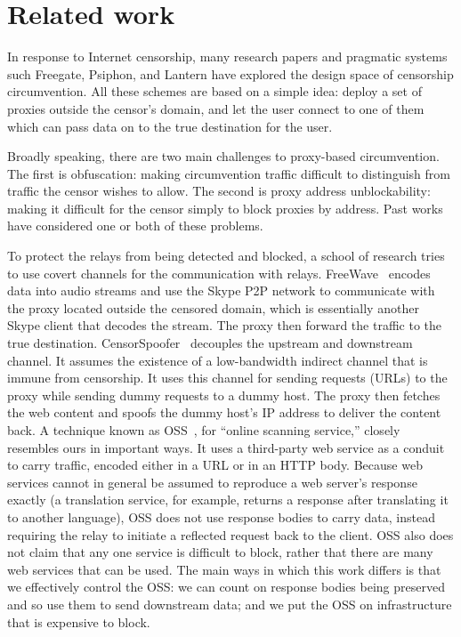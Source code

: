 \documentclass{article}
\begin{document}

\section{Related work}

In response to Internet censorship, many research papers and pragmatic systems
such Freegate, Psiphon, and Lantern have explored the design space of censorship
circumvention. All these schemes are based on a simple idea: deploy a set of
proxies outside the censor's domain, and let the user connect to one of them
which can pass data on to the true destination for the user.

Broadly speaking, there are two main challenges to proxy-based circumvention.
The first is obfuscation: making circumvention traffic difficult to distinguish
from traffic the censor wishes to allow. The second is proxy address
unblockability: making it difficult for the censor simply to block proxies by
address. Past works have considered one or both of these problems.

To protect the relays from being detected and blocked, a school of research
tries to use covert channels for the communication with relays.
FreeWave~\cite{freewave} encodes data into audio streams and use the Skype P2P
network to communicate with the proxy located outside the censored domain, which
is essentially another Skype client that decodes the stream. The proxy then
forward the traffic to the true destination. CensorSpoofer~\cite{censorspoofer}
decouples the upstream and downstream channel. It assumes the existence of a
low-bandwidth indirect channel that is immune from censorship. It uses this
channel for sending requests (URLs) to the proxy while sending dummy requests to a
dummy host. The proxy then fetches the web content and spoofs the dummy host's
IP address to deliver the content back. A technique known as OSS~\cite{oss}, for
``online scanning service,'' closely resembles ours in important ways. It uses a
third-party web service as a conduit to carry traffic, encoded either in a URL
or in an HTTP body. Because web services cannot in general be assumed to
reproduce a web server's response exactly (a translation service, for example,
returns a response after translating it to another language), OSS does not use
response bodies to carry data, instead requiring the relay to initiate a
reflected request back to the client. OSS also does not claim that any one
service is difficult to block, rather that there are many web services that can
be used. The main ways in which this work differs is that we effectively control
the OSS: we can count on response bodies being preserved and so use them to send
downstream data; and we put the OSS on infrastructure that is expensive to
block.
\end{document}
